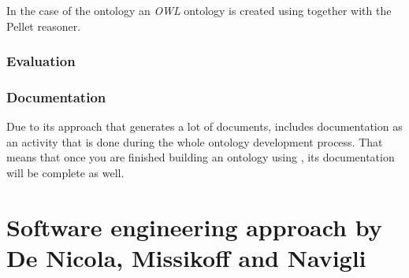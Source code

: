 In the case of the \thinkhomeweather ontology an \emph{OWL} ontology is created using \protege together with the Pellet reasoner.

\subsubsection{Evaluation}


\subsubsection{Documentation}

Due to its approach that generates a lot of documents, \methontology includes documentation as an activity that is done during the whole ontology development process. That means that once you are finished building an ontology using \methontology, its documentation will be complete as well.

\section{Software engineering approach by De Nicola, Missikoff and Navigli}

